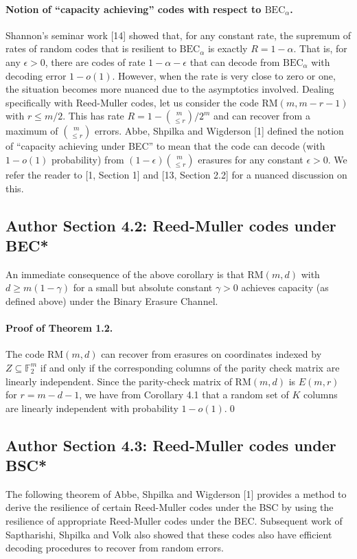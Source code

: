 \paragraph{Notion of ``capacity achieving'' codes with respect to $\mathrm{BEC}_\alpha$.} Shannon's seminar work [14] showed that, for any constant rate, the supremum of rates of random codes that is resilient to $\mathrm{BEC}_\alpha$ is exactly $R=1-\alpha$. That is, for any $\epsilon>0$, there are codes of rate $1-\alpha-\epsilon$ that can decode from $\mathrm{BEC}_\alpha$ with decoding error $1-o(1)$. However, when the rate is very close to zero or one, the situation becomes more nuanced due to the asymptotics involved.
Dealing specifically with Reed-Muller codes, let us consider the code $\mathrm{RM}(m,m-r-1)$ with $r\le m/2$. This has rate $R=1-\binom m{\le r}/2^m$ and can recover from a maximum of $\binom m{\le r}$ errors. Abbe, Shpilka and Wigderson [1] defined the notion of ``capacity achieving under BEC'' to mean that the code can decode (with $1-o(1)$ probability) from $(1-\epsilon)\binom m{\le r}$ erasures for any constant $\epsilon>0$. We refer the reader to [1, Section 1] and [13, Section 2.2] for a nuanced discussion on this.
\subsection*{Author Section 4.2: Reed-Muller codes under BEC*}
An immediate consequence of the above corollary is that $\mathrm{RM}(m,d)$ with $d\ge m(1-\gamma)$ for a small but absolute constant $\gamma>0$ achieves capacity (as defined above) under the Binary Erasure Channel.
\paragraph{Proof of Theorem 1.2.} The code $\mathrm{RM}(m,d)$ can recover from erasures on coordinates indexed by $Z\subseteq\mathbb F_2^m$ if and only if the corresponding columns of the parity check matrix are linearly independent. Since the parity-check matrix of $\mathrm{RM}(m,d)$ is $E(m,r)$ for $r=m-d-1$, we have from Corollary 4.1 that a random set of $K$ columns are linearly independent with probability $1-o(1)$.\qed
\subsection*{Author Section 4.3: Reed-Muller codes under BSC*}
The following theorem of Abbe, Shpilka and Wigderson [1] provides a method to derive the resilience of certain Reed-Muller codes under the BSC by using the resilience of appropriate Reed-Muller codes under the BEC. Subsequent work of Saptharishi, Shpilka and Volk also showed that these codes also have efficient decoding procedures to recover from random errors.
